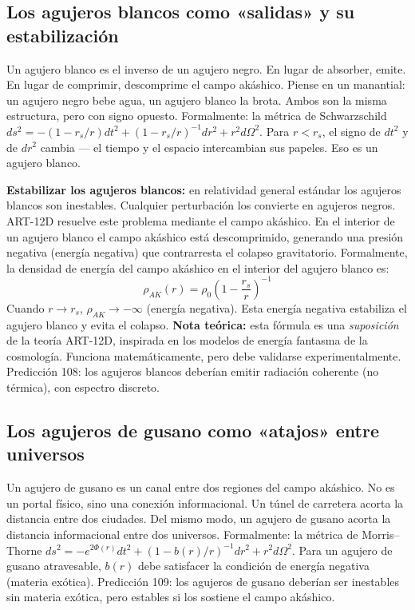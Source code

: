 \documentclass[11pt,a4paper]{article}
\begin{document}
\subsection{Los agujeros blancos como «salidas» y su estabilización}
Un agujero blanco es el inverso de un agujero negro. En lugar de absorber, emite. En lugar de comprimir, descomprime el campo akáshico. Piense en un manantial: un agujero negro bebe agua, un agujero blanco la brota. Ambos son la misma estructura, pero con signo opuesto. Formalmente: la métrica de Schwarzschild $ds^2 = -(1-r_s/r)dt^2 + (1-r_s/r)^{-1}dr^2 + r^2 d\Omega^2$. Para $r < r_s$, el signo de $dt^2$ y de $dr^2$ cambia --- el tiempo y el espacio intercambian sus papeles. Eso es un agujero blanco.

\textbf{Estabilizar los agujeros blancos:} en relatividad general estándar los agujeros blancos son inestables. Cualquier perturbación los convierte en agujeros negros. ART-12D resuelve este problema mediante el campo akáshico. En el interior de un agujero blanco el campo akáshico está descomprimido, generando una presión negativa (energía negativa) que contrarresta el colapso gravitatorio. Formalmente, la densidad de energía del campo akáshico en el interior del agujero blanco es:
\begin{equation}
\rho_{AK}(r) = \rho_0 \left(1 - \frac{r_s}{r}\right)^{-1}
\end{equation}
Cuando $r \to r_s$, $\rho_{AK} \to -\infty$ (energía negativa). Esta energía negativa estabiliza el agujero blanco y evita el colapso. \textbf{Nota teórica:} esta fórmula es una \textit{suposición} de la teoría ART-12D, inspirada en los modelos de energía fantasma de la cosmología. Funciona matemáticamente, pero debe validarse experimentalmente. Predicción 108: los agujeros blancos deberían emitir radiación coherente (no térmica), con espectro discreto.

\subsection{Los agujeros de gusano como «atajos» entre universos}
Un agujero de gusano es un canal entre dos regiones del campo akáshico. No es un portal físico, sino una conexión informacional. Un túnel de carretera acorta la distancia entre dos ciudades. Del mismo modo, un agujero de gusano acorta la distancia informacional entre dos universos. Formalmente: la métrica de Morris--Thorne $ds^2 = -e^{2\Phi(r)}dt^2 + (1-b(r)/r)^{-1}dr^2 + r^2 d\Omega^2$. Para un agujero de gusano atravesable, $b(r)$ debe satisfacer la condición de energía negativa (materia exótica). Predicción 109: los agujeros de gusano deberían ser inestables sin materia exótica, pero estables si los sostiene el campo akáshico.
\end{document}
